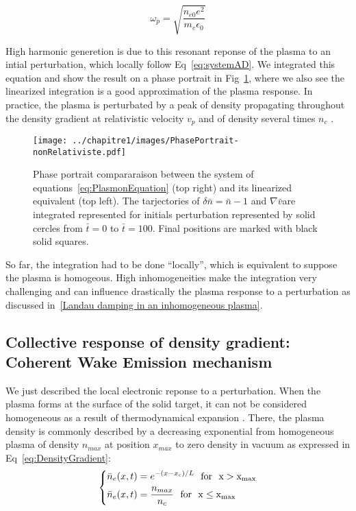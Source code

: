 $$
\omega_p = \sqrt{\frac{n_{e0}e^2}{m_e\epsilon_0}}
$$


\noindent High harmonic generetion is due to this resonant reponse of the plasma to an intial perturbation, which locally follow Eq~\ref{eq:systemAD}. We integrated this equation and show the result on a phase portrait in Fig~\ref{fig:PhasePortrait-nonRelativiste}, where we also see the linearized integration is a good approximation of the plasma response. In practice, the plasma is perturbated by a peak of density propagating throughout the density gradient at relativistic velocity $v_p$ and of density several times $n_c$ \cite{thaury2010high,TheseArnaud}.

\begin{figure}[H]
\centering
\texttt{[image: ../chapitre1/images/PhasePortrait-nonRelativiste.pdf]}\\
\caption{\label{fig:PhasePortrait-nonRelativiste}Phase portrait compararaison between the system of equations~\ref{eq:PlasmonEquation} (top right) and 
its linearized equivalent (top left). The tarjectories of $\delta \bar{n} = \bar{n}-1$ and $\nabla\bar{v}$are integrated represented for initials perturbation represented by solid cercles from $\bar{t} = 0$ to $\bar{t}=100$. Final positions are marked with black solid squares.}
\end{figure}

\noindent So far, the integration had to be done ``locally'', which is equivalent to suppose the plasma is homogeous. High inhomogeneities make the integration very challenging and can influence drastically the plasma response to a perturbation as discussed in~\ref{Landau damping in an inhomogeneous plasma}.


\subsection{Collective response of density gradient: Coherent Wake Emission mechanism}\label{subsubsection:Collective response of density gradient}
\label{subsection:Collective response of density gradient}\label{subsubsection:Collective response of density gradient}

We just described the local electronic reponse to a perturbation. When the plasma forms at the surface of the solid target, it can not be considered homogeneous as a result of thermodynamical expansion \cite{Kruer1988}.
There, the plasma density is commonly described by a decreasing exponential \cite{kruer1988physics,mora2003plasma} from homogeneous plasma of density $n_{max}$ at position $x_{max}$ to zero density in vacuum as expressed in Eq~\ref{eq:DensityGradient}:
\begin{equation}
  \left\{
      \begin{aligned}
&\bar{n}_e(x,t) = e^{-(x-x_c)/L} \ \ \rm{for} \ \ x > x_{max}  \\
&\bar{n}_e(x,t) = \frac{n_{max}}{n_c} \ \ \rm{for} \ \ x \le x_{max}
      \end{aligned}
    \right.
\label{eq:DensityGradient}
\end{equation}

